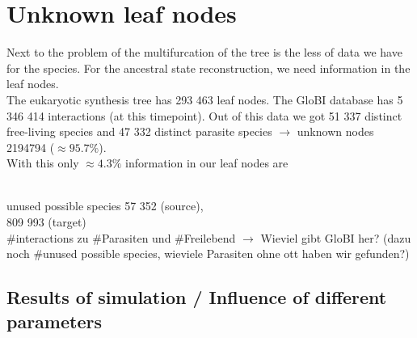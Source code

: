   \section{Unknown leaf nodes}
    Next to the problem of the multifurcation of the tree is the less of data we have for the species.
      For the ancestral state reconstruction, we need information in the leaf nodes. \\
    The eukaryotic synthesis tree has 293 463 leaf nodes. The GloBI database has 5 346 414 interactions 
      (at this timepoint). Out of this data we got 51 337 distinct free-living species and 47 332 
      distinct parasite species $\rightarrow$ unknown nodes 2194794 ($\approx 95.7\%$). \\
    With this only $\approx 4.3\%$ information in our leaf nodes are 

     \\
    unused possible species  57 352 (source), \\
    809 993 (target) \\

    \#interactions zu \#Parasiten und \#Freilebend $\rightarrow$ Wieviel gibt GloBI her? (dazu noch 
      \#unused possible species, wieviele Parasiten ohne ott haben wir gefunden?)

    \subsection{Results of simulation / Influence of different parameters}

